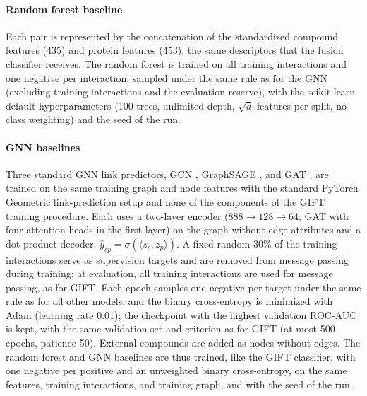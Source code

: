 \documentclass[11pt,letterpaper]{article}
\begin{document}
\paragraph{Random forest baseline}
Each pair is represented by the concatenation of the standardized compound features (435) and protein features (453), the same descriptors that the fusion classifier receives. The random forest \cite{breiman2001random} is trained on all training interactions and one negative per interaction, sampled under the same rule as for the GNN (excluding training interactions and the evaluation reserve), with the scikit-learn default hyperparameters (100 trees, unlimited depth, $\sqrt{d}$ features per split, no class weighting) and the seed of the run.

\paragraph{GNN baselines}
Three standard GNN link predictors, GCN \cite{kipf2017semi}, GraphSAGE \cite{hamilton2017inductive}, and GAT \cite{velickovic2018graph}, are trained on the same training graph and node features with the standard PyTorch Geometric link-prediction setup and none of the components of the GIFT training procedure. Each uses a two-layer encoder ($888\to128\to64$; GAT with four attention heads in the first layer) on the graph without edge attributes and a dot-product decoder, $\hat{y}_{cp}=\sigma(\langle z_c,z_p\rangle)$. A fixed random 30\% of the training interactions serve as supervision targets and are removed from message passing during training; at evaluation, all training interactions are used for message passing, as for GIFT. Each epoch samples one negative per target under the same rule as for all other models, and the binary cross-entropy is minimized with Adam (learning rate 0.01); the checkpoint with the highest validation ROC-AUC is kept, with the same validation set and criterion as for GIFT (at most 500 epochs, patience 50). External compounds are added as nodes without edges. The random forest and GNN baselines are thus trained, like the GIFT classifier, with one negative per positive and an unweighted binary cross-entropy, on the same features, training interactions, and training graph, and with the seed of the run.
\end{document}
